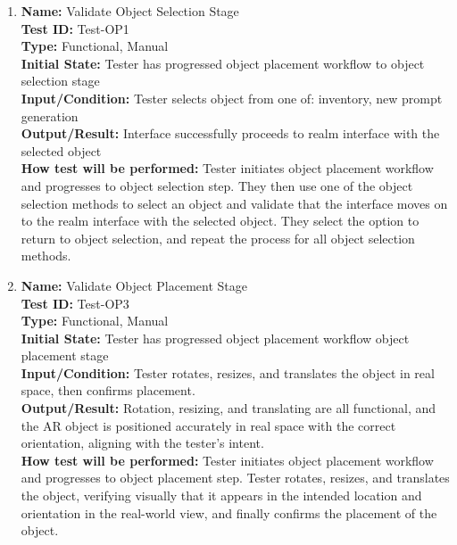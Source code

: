 \documentclass[12pt, titlepage]{article}
\begin{document}
\begin{enumerate}


  \item \textbf{Name:} Validate Object Selection Stage \label{itm:Test-OP1} \\
        \textbf{Test ID:} Test-OP1 \\
        \textbf{Type:} Functional, Manual \\
        \textbf{Initial State:} Tester has progressed object placement workflow to object selection stage \\
        \textbf{Input/Condition:} Tester selects object from one of: inventory, new prompt generation \\
        \textbf{Output/Result:} Interface successfully proceeds to realm interface with the selected object \\
        \textbf{How test will be performed:} Tester initiates object placement workflow and progresses to object selection step. They then use one of the object selection methods to select an object and validate that the interface moves on to the realm interface with the selected object. They select the option to return to object selection, and repeat the process for all object selection methods.

  \item \textbf{Name:} Validate Object Placement Stage \label{itm:Test-OP3} \\
        \textbf{Test ID:} Test-OP3 \\
        \textbf{Type:} Functional, Manual \\
        \textbf{Initial State:} Tester has progressed object placement workflow object placement stage \\
        \textbf{Input/Condition:} Tester rotates, resizes, and translates the object in real space, then confirms placement. \\
        \textbf{Output/Result:} Rotation, resizing, and translating are all functional, and the AR object is positioned accurately in real space with the correct orientation, aligning with the tester's intent. \\
        \textbf{How test will be performed:} Tester initiates object placement workflow and progresses to object placement step. Tester rotates, resizes, and translates the object, verifying visually that it appears in the intended location and orientation in the real-world view, and finally confirms the placement of the object.


\end{enumerate}
\end{document}
